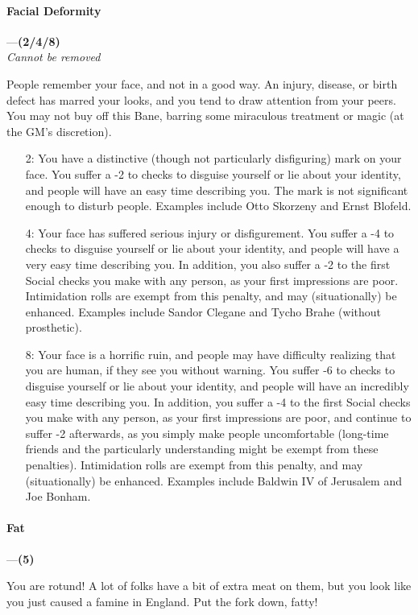 \documentclass[oneside,11pt,english]{book}
\begin{document}
\paragraph{\label{bane:Facial Deformity}Facial Deformity}---\quad\textbf{(2/4/8) }\\
\textit{Cannot be removed}\par
People remember your face, and not in a good way. An injury, disease, or birth defect has marred your 
looks, and you tend to draw attention from your peers. You may not buy off this Bane, barring some 
miraculous treatment or magic (at the GM's discretion). 
\begin{itemize}
\item [2:] You have a distinctive (though not particularly disfiguring) mark on
  your face. You suffer a -2 to checks to disguise yourself or lie about your
  identity, and people will have an easy time describing you. The mark is not
  significant enough to disturb people. Examples include Otto Skorzeny and Ernst
  Blofeld.  
\item [4:] Your face has suffered serious injury or disfigurement. You suffer a
  -4 to checks to disguise yourself or lie about your identity, and people will
  have a very easy time describing you. In addition, you also suffer a -2 to the
  first Social checks you make with any person, as your first impressions are
  poor. Intimidation rolls are exempt from this penalty, and may (situationally)
  be enhanced. Examples include Sandor Clegane and Tycho Brahe (without
  prosthetic). 
\item [8:] Your face is a horrific ruin, and people may have difficulty
  realizing that you are human, if they see you without warning. You suffer -6
  to checks to disguise yourself or lie about your identity, and people will
  have an incredibly easy time describing you. In addition, you suffer a -4 to
  the first Social checks you make with any person, as your first impressions
  are poor, and continue to suffer -2 afterwards, as you simply make people
  uncomfortable (long-time friends and the particularly understanding might be
  exempt from these penalties). Intimidation rolls are exempt from this penalty,
  and may (situationally) be enhanced. Examples include Baldwin IV of Jerusalem
  and Joe Bonham. 
\end{itemize}
\paragraph{\label{bane:Fat}Fat}---\quad\textbf{(5)}\par
You are rotund! A lot of folks have a bit of extra meat on them, but you look like you just caused a 
famine in England. Put the fork down, fatty! 
\end{document}
